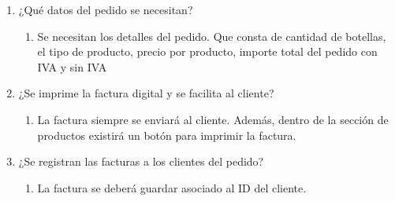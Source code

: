 \begin{enumerate}
    \item ¿Qué datos del pedido se necesitan?
    \begin{enumerate}
        \item Se necesitan los detalles del pedido. Que consta de cantidad de botellas, el tipo de producto, precio por producto, importe total del pedido con IVA y sin IVA
    \end{enumerate}

    \item ¿Se imprime la factura digital y se facilita al cliente?
    \begin{enumerate}
        \item La factura siempre se enviará al cliente. Además, dentro de la sección de productos existirá un botón para imprimir la factura.
    \end{enumerate}

    \item ¿Se registran las facturas a los clientes del pedido?
    \begin{enumerate}
        \item La factura se deberá guardar asociado al ID del cliente.
    \end{enumerate}
\end{enumerate}
